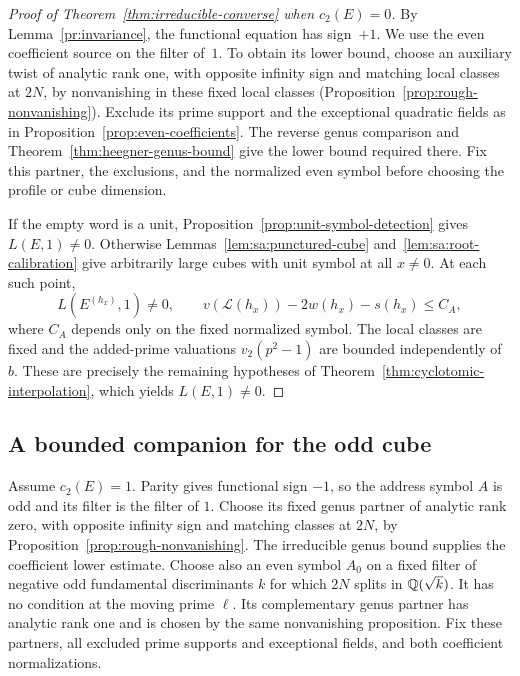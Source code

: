 \begin{proof}[Proof of Theorem~\ref{thm:irreducible-converse} when
$c_2(E)=0$]
By Lemma~\ref{pr:invariance}, the functional equation has
sign~$+1$.  We use the even coefficient source on the filter of~$1$.
To obtain its lower bound, choose an auxiliary twist of analytic rank
one, with opposite infinity sign and matching local classes at $2N$,
by nonvanishing in these fixed local classes
(Proposition~\ref{prop:rough-nonvanishing}).  Exclude its prime
support and the exceptional quadratic fields as in
Proposition~\ref{prop:even-coefficients}.  The reverse genus
comparison and Theorem~\ref{thm:heegner-genus-bound} give the lower
bound required there.  Fix this partner, the exclusions, and the
normalized even symbol before choosing the profile or cube dimension.

If the empty word is a unit, Proposition~\ref{prop:unit-symbol-detection}
gives $L(E,1)\ne0$.  Otherwise
Lemmas~\ref{lem:sa:punctured-cube} and~\ref{lem:sa:root-calibration}
give arbitrarily large cubes with unit symbol at all $x\ne0$.
At each such point,
\[
 L(E^{(h_x)},1)\ne0,
 \qquad
 v(\mathcal L(h_x))-2w(h_x)-s(h_x)\le C_A,
\]
where $C_A$ depends only on the fixed normalized symbol.  The local
classes are fixed and the added-prime valuations $v_2(p^2-1)$ are
bounded independently of $b$.  These are precisely the remaining
hypotheses of Theorem~\ref{thm:cyclotomic-interpolation}, which yields
$L(E,1)\ne0$.
\end{proof}

\subsection{A bounded companion for the odd cube}

Assume $c_2(E)=1$. Parity gives functional sign $-1$, so the address
symbol $A$ is odd and its filter is the filter of $1$. Choose its fixed
genus partner of analytic rank zero, with opposite infinity sign and
matching classes at $2N$, by
Proposition~\ref{prop:rough-nonvanishing}. The irreducible genus bound
supplies the coefficient lower estimate. Choose also an even symbol
$A_0$ on a fixed filter of negative odd fundamental discriminants $k$
for which $2N$ splits in $\mathbb Q(\sqrt{k})$. It has no condition at the
moving prime $\ell$. Its complementary genus partner has analytic
rank one and is chosen by the same nonvanishing proposition.
Fix these partners, all excluded prime supports and exceptional fields,
and both coefficient normalizations.

